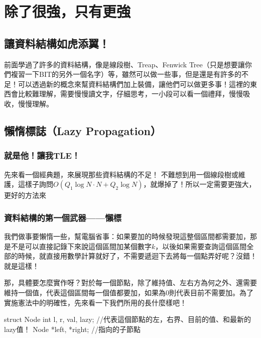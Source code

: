 \chapter{除了很強，只有更強}
	\section{讓資料結構如虎添翼！}
		前面學過了許多的資料結構，像是線段樹、Treap、Fenwick Tree（只是想要讓你們複習一下BIT的另外一個名字）等，雖然可以做一些事，但是還是有許多的不足！可以透過新的概念來幫資料結構們加上裝備，讓他們可以做更多事！這裡的東西會比較難理解，需要慢慢讀文字，仔細思考，一小段可以看一個禮拜，慢慢吸收，慢慢理解。
	\section{懶惰標誌（Lazy Propagation）}
		\subsection{就是他！讓我TLE！}
			先來看一個經典題，來展現那些資料結構的不足！
			不難想到用一個線段樹或維護，這樣子詢問$O(Q_1 \log N\cdot N + Q_2 \log N)$，就爆掉了！所以一定需要更強大，更好的方法來
		\subsection{資料結構的第一個武器——懶標}
			我們做事要懶惰一些，幫電腦省事：如果要加的時候發現這整個區間都需要加，那是不是可以直接記錄下來說這個區間加某個數字$k$，以後如果需要查詢這個區間全部的時候，就直接用數學計算就好了，不需要遞迴下去將每一個點弄好呢？沒錯！就是這樣！
			
			那，具體要怎麼實作呀？對於每一個節點，除了維持值、左右方為何之外、還需要維持一個值，代表這個區間每一個值都要加，如果為$0$則代表目前不需要加。為了實施憲法中的明確性，先來看一下我們所用的長什麼樣吧！
			\begin{C++}
struct Node{
	int l, r, val, lazy; //代表這個節點的左，右界、目前的值、和最新的lazy值！
	Node *left, *right; //指向的子節點
}
			\end{C++}
